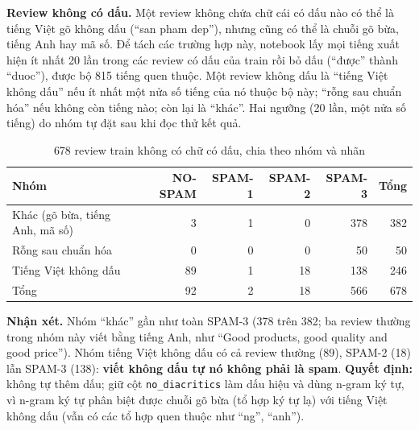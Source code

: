 \textbf{Review không có dấu.} Một review không chứa chữ cái có dấu nào có thể là tiếng Việt gõ không dấu (``san pham dep''), nhưng
cũng có thể là chuỗi gõ bừa, tiếng Anh hay mã số. Để tách các trường hợp này, notebook lấy mọi tiếng xuất hiện ít nhất 20 lần trong các
review có dấu của train rồi bỏ dấu (``được'' thành ``duoc''), được bộ 815 tiếng quen thuộc. Một review không dấu là ``tiếng Việt không dấu''
nếu ít nhất một nửa số tiếng của nó thuộc bộ này; ``rỗng sau chuẩn hóa'' nếu không còn tiếng nào; còn lại là ``khác''.
Hai ngưỡng (20 lần, một nửa số tiếng) do nhóm tự đặt sau khi đọc thử kết quả.

\begin{table}[H]
\centering
\caption{678 review train không có chữ có dấu, chia theo nhóm và nhãn}
\label{tab:text-nodiac}
\begin{tabular}{lrrrrr}
\toprule
Nhóm & NO-SPAM & SPAM-1 & SPAM-2 & SPAM-3 & Tổng\\
\midrule
Khác (gõ bừa, tiếng Anh, mã số) & 3 & 1 & 0 & 378 & 382\\
Rỗng sau chuẩn hóa & 0 & 0 & 0 & 50 & 50\\
Tiếng Việt không dấu & 89 & 1 & 18 & 138 & 246\\
\midrule
Tổng & 92 & 2 & 18 & 566 & 678\\
\bottomrule
\end{tabular}
\end{table}

\textbf{Nhận xét.} Nhóm ``khác'' gần như toàn SPAM-3 (378 trên 382; ba review thường trong nhóm này viết bằng tiếng Anh, như
``Good products, good quality and good price''). Nhóm tiếng Việt không dấu có cả review thường (89), SPAM-2 (18) lẫn SPAM-3 (138):
\textbf{viết không dấu tự nó không phải là spam}. \textbf{Quyết định:} không tự thêm dấu; giữ cột \texttt{no\_diacritics} làm dấu hiệu
và dùng n-gram ký tự, vì n-gram ký tự phân biệt được chuỗi gõ bừa (tổ hợp ký tự lạ) với tiếng Việt không dấu (vẫn có các tổ hợp quen thuộc như ``ng'', ``anh'').

